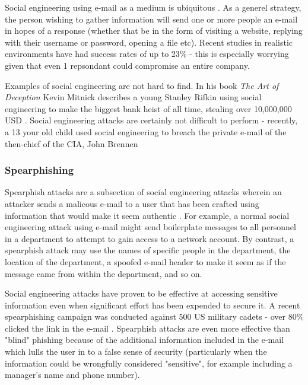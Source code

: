 \documentclass{article}
\begin{document}
Social engineering using e-mail as a medium is ubiquitous \citep{socialengineeringvulnerabilites}. As a generel strategy, the person wishing to gather information will send one or more people an e-mail in hopes of a response (whether that be in the form of visiting a website, replying with their username or password, opening a file etc). Recent studies in realistic environments have had success rates of up to 23\% \citep{socialengineeringvulnerabilites} - this is especially worrying given that even 1 repsondant could compromise an entire company.

Examples of social engineering are not hard to find. In his book \textit{The Art of Deception} Kevin Mitnick describes a young Stanley Rifkin using social engineering to make the biggest bank heist of all time, stealing over 10,000,000 USD \citep{mitnick}. Social engineering attacks are certainly not difficult to perform - recently, a 13 your old child used social engineering to breach the private e-mail of the then-chief of the CIA, John Brennen \citep{cia13yearold}

\subsubsection{Spearphishing}
Spearphish attacks are a subsection of social engineering attacks wherein an attacker sends a malicous e-mail to a user that has been crafted using information that would make it seem authentic \citep{spearphishing}. For example, a normal social engineering attack using e-mail might send boilerplate messages to all personnel in a department to attempt to gain access to a network account. By contrast, a spearphish attack may use the names of specific people in the department, the location of the department, a spoofed e-mail header to make it seem as if the message came from within the department, and so on.

Social engineering attacks have proven to be effective at accessing sensitive information even when significant effort has been expended to secure it. A recent spearphishing campaign was conducted against 500 US military cadets - over 80\% clicked the link in the e-mail \citep{spearphishing}. Spearphish attacks are even more effective than "blind" phishing because of the additional information included in the e-mail which lulls the user in to a false sense of security (particularly when the information could be wrongfully considered "sensitive", for example including a manager's name and phone number).
\end{document}
